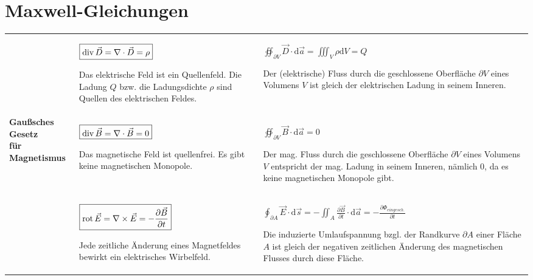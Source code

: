 \section{Maxwell-Gleichungen}
\begin{table}[H]
	\centering
	\begin{tabularx}{\textwidth}{l | X | X}
		\makecell[l]{\textbf{Gaußsches Gesetz}} & 
			\(\boxed{\operatorname{div} \vec{D} = \nabla \cdot \vec{D} = \rho}\) \par \vspace*{3pt} \footnotesize 
				Das elektrische Feld ist ein Quellenfeld. Die Ladung \(Q\) bzw. die Ladungsdichte \(\rho\) sind Quellen des elektrischen Feldes. & 
			\(\boxed{\oiint_{\partial V} \vec{D} \cdot \mathrm{d} \vec{a} = \iiint_V \rho \mathrm{d}V = Q}\) \par \vspace*{3pt} \footnotesize
				Der (elektrische) Fluss durch die geschlossene Oberfläche \(\partial V\) eines Volumens \(V\) ist gleich der elektrischen Ladung in seinem Inneren. \\
		\makecell[l]{\textbf{Gaußsches Gesetz} \\ \textbf{für Magnetismus}} & 
			\(\boxed{\operatorname{div} \vec{B} = \nabla \cdot \vec{B} = 0}\) \par \vspace*{3pt} \footnotesize 
				Das magnetische Feld ist quellenfrei. Es gibt keine magnetischen Monopole. & 
			\(\boxed{\oiint_{\partial V} \vec{B} \cdot \mathrm{d} \vec{a} = 0}\) \par \vspace*{3pt} \footnotesize 
				Der mag. Fluss durch die geschlossene Oberfläche \(\partial V\) eines Volumens \(V\) entspricht der mag. Ladung in seinem Inneren, nämlich 0, da es keine magnetischen Monopole gibt. \\
		\makecell[l]{\textbf{Induktionsgesetz}} & 
			\(\boxed{\operatorname{rot} \vec{E} = \nabla \times \vec{E} = -\frac{\partial \vec{B}}{\partial t}}\) \par \vspace*{3pt} \footnotesize 
				Jede zeitliche Änderung eines Magnetfeldes bewirkt ein elektrisches Wirbelfeld. & 
			\(\boxed{\oint_{\partial A} \vec{E} \cdot \mathrm{d} \vec{s} = -\iint_A \frac{\partial \vec{B}}{\partial t} \cdot \mathrm{d} \vec{a} = -\frac{\partial \Phi_{eingesch.}}{\partial t}}\)  \par \vspace*{3pt} \footnotesize 
				Die induzierte Umlaufspannung bzgl. der Randkurve \(\partial A\) einer Fläche \(A\) ist gleich der negativen zeitlichen Änderung des magnetischen Flusses durch diese Fläche. \\

\end{tabularx}
\end{table}
